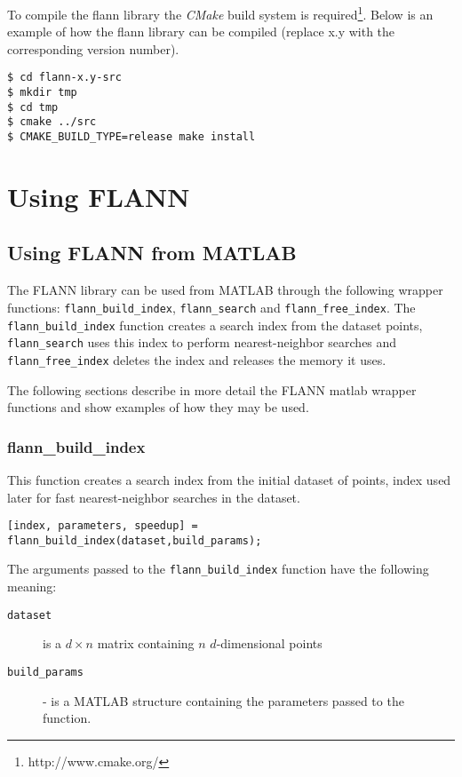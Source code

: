 \documentclass[letter,10pt]{article}
\begin{document}
To compile the flann library the \textit{CMake} build system is required\footnote{http://www.cmake.org/}.
Below is an example of how the flann library can be compiled (replace x.y with the corresponding version number).
\begin{Verbatim}[fontsize=\scriptsize,frame=single]
$ cd flann-x.y-src
$ mkdir tmp
$ cd tmp
$ cmake ../src
$ CMAKE_BUILD_TYPE=release make install
\end{Verbatim}




\section{Using FLANN}

\subsection{Using FLANN from MATLAB}


The FLANN library can be used from MATLAB through the following wrapper
functions: \texttt{flann\_build\_index}, \texttt{flann\_search} and
\texttt{flann\_free\_index}. The \texttt{flann\_build\_index} function
creates a search index from the dataset points, \texttt{flann\_search} uses
this index to perform nearest-neighbor searches and
\texttt{flann\_free\_index} deletes the index and releases the memory it
uses.

The following sections describe in more detail the FLANN matlab wrapper
functions and show examples of how they may be used.

\subsubsection{flann\_build\_index}
\label{sec:flann_build_index}

This function creates a search index from the initial dataset of points,
index used  later for fast nearest-neighbor searches in the dataset.

\begin{Verbatim}
[index, parameters, speedup] = flann_build_index(dataset,build_params);
\end{Verbatim}


The arguments passed to the \texttt{flann\_build\_index} function have the
following meaning:
\begin{description}

\item [\texttt{dataset}] is a $d \times n$ matrix containing $n$
$d$-dimensional points

\item [\texttt{build\_params}] - is a MATLAB structure containing the
parameters passed to the function.

\end{description}
\end{document}
